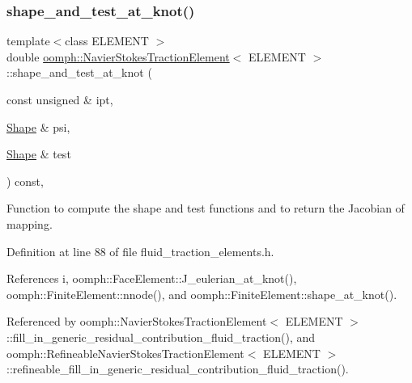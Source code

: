 \subsubsection{\texorpdfstring{shape\+\_\+and\+\_\+test\+\_\+at\+\_\+knot()}{shape\_and\_test\_at\_knot()}}
{\footnotesize\ttfamily template$<$class E\+L\+E\+M\+E\+NT $>$ \\
double \hyperlink{classoomph_1_1NavierStokesTractionElement}{oomph\+::\+Navier\+Stokes\+Traction\+Element}$<$ E\+L\+E\+M\+E\+NT $>$\+::shape\+\_\+and\+\_\+test\+\_\+at\+\_\+knot (\begin{DoxyParamCaption}\item[{const unsigned \&}]{ipt,  }\item[{\hyperlink{classoomph_1_1Shape}{Shape} \&}]{psi,  }\item[{\hyperlink{classoomph_1_1Shape}{Shape} \&}]{test }\end{DoxyParamCaption}) const\hspace{0.3cm}{\ttfamily [inline]}, {\ttfamily [protected]}}



Function to compute the shape and test functions and to return the Jacobian of mapping. 



Definition at line 88 of file fluid\+\_\+traction\+\_\+elements.\+h.



References i, oomph\+::\+Face\+Element\+::\+J\+\_\+eulerian\+\_\+at\+\_\+knot(), oomph\+::\+Finite\+Element\+::nnode(), and oomph\+::\+Finite\+Element\+::shape\+\_\+at\+\_\+knot().



Referenced by oomph\+::\+Navier\+Stokes\+Traction\+Element$<$ E\+L\+E\+M\+E\+N\+T $>$\+::fill\+\_\+in\+\_\+generic\+\_\+residual\+\_\+contribution\+\_\+fluid\+\_\+traction(), and oomph\+::\+Refineable\+Navier\+Stokes\+Traction\+Element$<$ E\+L\+E\+M\+E\+N\+T $>$\+::refineable\+\_\+fill\+\_\+in\+\_\+generic\+\_\+residual\+\_\+contribution\+\_\+fluid\+\_\+traction().

\mbox{\label{classoomph_1_1NavierStokesTractionElement_a61e835222d62341faf05a991b1be04c4}} 
